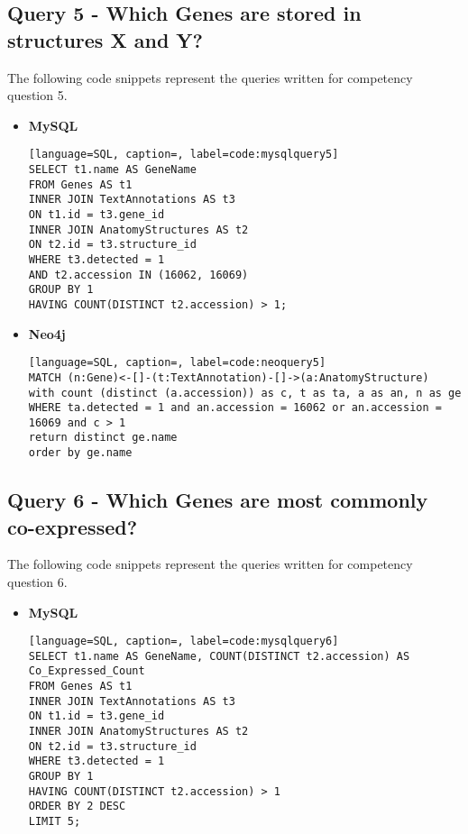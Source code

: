 \subsection*{Query 5 - Which Genes are stored in structures X and Y?}\label{query5}
The following code snippets represent the queries written for competency question 5.
\begin{itemize}
\item \textbf{MySQL}
\begin{lstlisting}[language=SQL, caption=, label=code:mysqlquery5]
SELECT t1.name AS GeneName
FROM Genes AS t1
INNER JOIN TextAnnotations AS t3
ON t1.id = t3.gene_id
INNER JOIN AnatomyStructures AS t2
ON t2.id = t3.structure_id
WHERE t3.detected = 1
AND t2.accession IN (16062, 16069)
GROUP BY 1
HAVING COUNT(DISTINCT t2.accession) > 1;
\end{lstlisting}
\item \textbf{Neo4j}
\begin{lstlisting}[language=SQL, caption=, label=code:neoquery5]
MATCH (n:Gene)<-[]-(t:TextAnnotation)-[]->(a:AnatomyStructure)
with count (distinct (a.accession)) as c, t as ta, a as an, n as ge
WHERE ta.detected = 1 and an.accession = 16062 or an.accession = 16069 and c > 1
return distinct ge.name
order by ge.name
\end{lstlisting}
\end{itemize}
\subsection*{Query 6 - Which Genes are most commonly co-expressed?}\label{query6}
The following code snippets represent the queries written for competency question 6.
\begin{itemize}
\item \textbf{MySQL}
\begin{lstlisting}[language=SQL, caption=, label=code:mysqlquery6]
SELECT t1.name AS GeneName, COUNT(DISTINCT t2.accession) AS Co_Expressed_Count
FROM Genes AS t1
INNER JOIN TextAnnotations AS t3
ON t1.id = t3.gene_id
INNER JOIN AnatomyStructures AS t2
ON t2.id = t3.structure_id
WHERE t3.detected = 1
GROUP BY 1
HAVING COUNT(DISTINCT t2.accession) > 1
ORDER BY 2 DESC
LIMIT 5;
\end{lstlisting}
\end{itemize}
